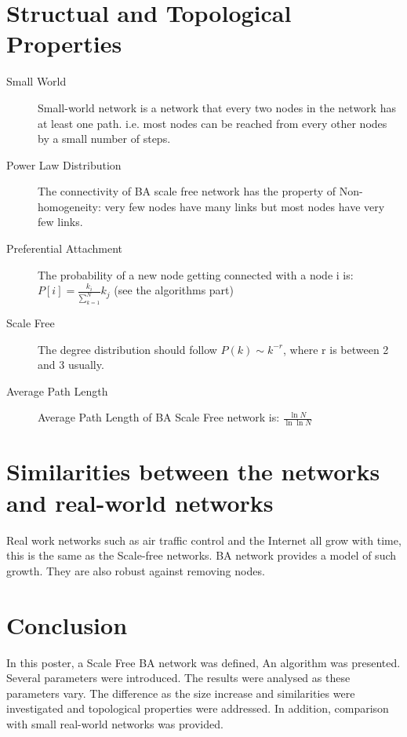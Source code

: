\documentclass[a0,final]{a0poster}
\begin{document}
\begin{multicols}{3}
\section*{Structual and Topological Properties}

\begin{description} 
\item[Small World] Small-world network is a network that every two nodes in the network has at least one path. i.e. most nodes can be reached from every other nodes by a small number of steps. 
  \item[Power Law Distribution] The connectivity of BA scale free network has the property of Non-homogeneity: very few nodes have many links but most nodes have very few links.
  \item[Preferential Attachment] The probability of a new node getting connected with a node i is: $P[i] = \frac{k_i}{\sum\limits_{k=1}^N} k_j$ (see the algorithms part)


  \item[Scale Free] The degree distribution should follow $P(k) \sim k^{-r}$, where r is between 2 and 3 usually.
\item[Average Path Length] Average Path Length of BA Scale Free network is:  $\frac{\ln{N}}{\ln{\ln{N}}}$
\end{description}

\section*{Similarities between the networks and real-world networks}
Real work networks such as air traffic control and the Internet all grow with time, this is the same as the Scale-free networks. BA network provides a model of such growth. They are also robust against removing nodes. 




\section*{Conclusion}
In this poster, a Scale Free BA network was defined, An algorithm was presented. Several parameters were introduced. The results were analysed as these parameters vary. The difference as the size increase and similarities were investigated and topological properties were addressed. In addition, comparison with small real-world networks was provided. 




\end{multicols}
\end{document}
